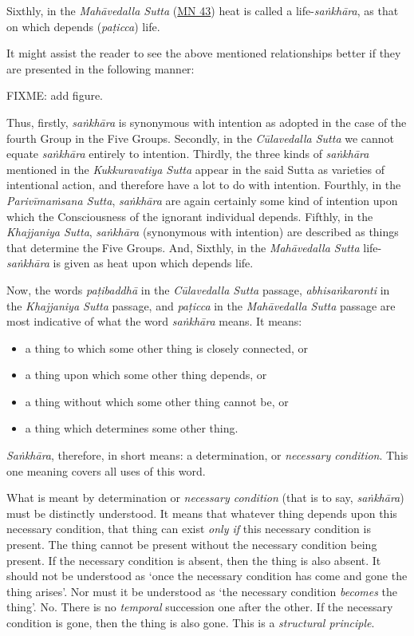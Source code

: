 Sixthly, in the \textit{Mahāvedalla Sutta} (\href{https://suttacentral.net/mn43/en/sujato}{MN 43}) heat is called a life-\textit{saṅkhāra}, as that on which depends (\textit{paṭicca}) life.

It might assist the reader to see the above mentioned relationships better if they are presented in the following manner:

FIXME: add figure.

Thus, firstly, \textit{saṅkhāra} is synonymous with intention as adopted in the case of the fourth Group in the Five Groups. Secondly, in the \textit{Cūlavedalla Sutta} we cannot equate \textit{saṅkhāra} entirely to intention. Thirdly, the three kinds of \textit{saṅkhāra} mentioned in the \textit{Kukkuravatiya Sutta} appear in the said Sutta as varieties of intentional action, and therefore have a lot to do with intention. Fourthly, in the \textit{Parivīmaṁsana Sutta}, \textit{saṅkhāra} are again certainly some kind of intention upon which the Consciousness of the ignorant individual depends. Fifthly, in the \textit{Khajjaniya Sutta}, \textit{saṅkhāra} (synonymous with intention) are described as things that determine the Five Groups. And, Sixthly, in the \textit{Mahāvedalla Sutta} life-\textit{saṅkhāra} is given as heat upon which depends life.

Now, the words \textit{paṭibaddhā} in the \textit{Cūlavedalla Sutta} passage, \textit{abhisaṅkaronti} in the \textit{Khajjaniya Sutta} passage, and \textit{paṭicca} in the \textit{Mahāvedalla Sutta} passage are most indicative of what the word \textit{saṅkhāra} means. It means:

\begin{itemize}
\item
  a thing to which some other thing is closely connected, or
\item
  a thing upon which some other thing depends, or
\item
  a thing without which some other thing cannot be, or
\item
  a thing which determines some other thing.
\end{itemize}

\textit{Saṅkhāra}, therefore, in short means: a determination, or \emph{necessary condition}. This one meaning covers all uses of this word.

What is meant by determination or \emph{necessary condition} (that is to say, \textit{saṅkhāra}) must be distinctly understood. It means that whatever thing depends upon this necessary condition, that thing can exist \emph{only if} this necessary condition is present. The thing cannot be present without the necessary condition being present. If the necessary condition is absent, then the thing is also absent. It should not be understood as `once the necessary condition has come and gone the thing arises'. Nor must it be understood as `the necessary condition \emph{becomes} the thing'. No. There is no \emph{temporal} succession one after the other. If the necessary condition is gone, then the thing is also gone. This is a \emph{structural principle}.

